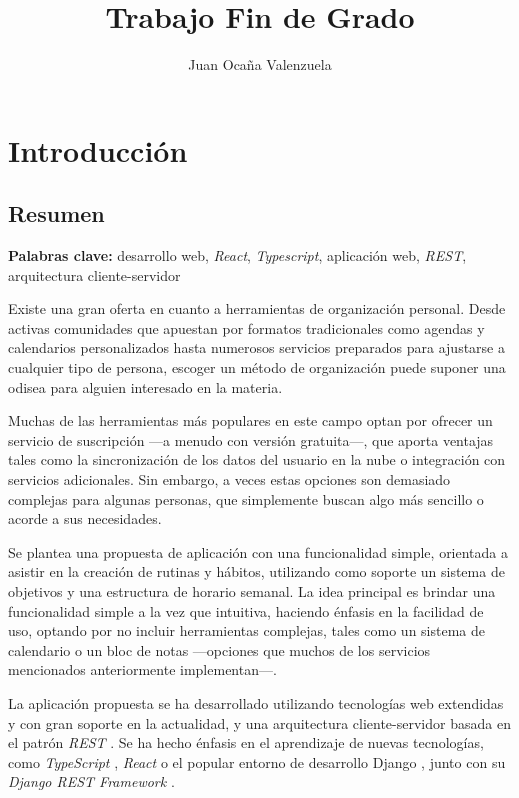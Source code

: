 \documentclass[10pt, a4paper]{aqademic}
\author{Juan Ocaña Valenzuela}
\title{Trabajo Fin de Grado}
\begin{document}
\AqMaketitle[%
	cover    = img/logo.png,
	org      = Grado en Ingeniería Informática,
	subtitle = Aplicación de gestión de rutinas semanales basada en tecnologías web
]
\tableofcontents

\chapter{Introducción}

\section{Resumen}
\textbf{Palabras clave:} desarrollo web, \textit{React}, \textit{Typescript}, aplicación web, \textit{REST}, arquitectura cliente-servidor

\bigskip

Existe una gran oferta en cuanto a herramientas de organización personal. Desde activas comunidades que apuestan por formatos tradicionales como agendas y calendarios personalizados hasta numerosos servicios preparados para ajustarse a cualquier tipo de persona, escoger un método de organización puede suponer una odisea para alguien interesado en la materia. 

\medskip

Muchas de las herramientas más populares en este campo optan por ofrecer un servicio de suscripción ---a menudo con versión gratuita---, que aporta ventajas tales como la sincronización de los datos del usuario en la nube o integración con servicios adicionales. Sin embargo, a veces estas opciones son demasiado complejas para algunas personas, que simplemente buscan algo más sencillo o acorde a sus necesidades.

\medskip

Se plantea una propuesta de aplicación con una funcionalidad simple, orientada a asistir en la creación de rutinas y hábitos, utilizando como soporte un sistema de objetivos y una estructura de horario semanal. La idea principal es brindar una funcionalidad simple a la vez que intuitiva, haciendo énfasis en la facilidad de uso, optando por no incluir herramientas complejas, tales como un sistema de calendario o un bloc de notas ---opciones que muchos de los servicios mencionados anteriormente implementan---.

\medskip

La aplicación propuesta se ha desarrollado utilizando tecnologías web extendidas y con gran soporte en la actualidad, y una arquitectura cliente-servidor basada en el patrón \textit{REST} \cite{fielding2000architectural}. Se ha hecho énfasis en el aprendizaje de nuevas tecnologías, como \textit{TypeScript} \cite{bierman2014understanding}, \textit{React} \cite{react} o el popular entorno de desarrollo Django \cite{django}, junto con su \textit{Django REST Framework} \cite{drf}.
\end{document}

